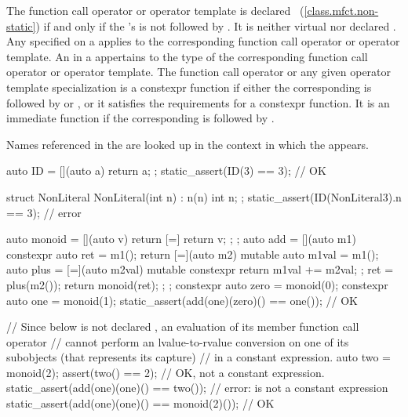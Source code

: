 \pnum
The function call operator or operator template is declared
~(\ref{class.mfct.non-static}) if and only if the
's  is not
followed by . It is neither virtual nor declared . Any
 specified on a 
applies to the corresponding function call operator or operator template.
An  in a  appertains
to the type of the corresponding function call operator or operator template.
The function call operator or any given operator template specialization
is a constexpr function if either
the corresponding 
is followed by  or , or
it satisfies the requirements for a constexpr function.
It is an immediate function
if the corresponding 
 is followed by .
\begin{note}
Names referenced in
the  are looked up in the context in which the
 appears.
\end{note}
\begin{example}
\begin{codeblock}
auto ID = [](auto a) { return a; };
static_assert(ID(3) == 3);                      // OK

struct NonLiteral {
  NonLiteral(int n) : n(n) { }
  int n;
};
static_assert(ID(NonLiteral{3}).n == 3);        // error
\end{codeblock}
\end{example}

\pnum
\begin{example}
\begin{codeblock}
auto monoid = [](auto v) { return [=] { return v; }; };
auto add = [](auto m1) constexpr {
  auto ret = m1();
  return [=](auto m2) mutable {
    auto m1val = m1();
    auto plus = [=](auto m2val) mutable constexpr
                   { return m1val += m2val; };
    ret = plus(m2());
    return monoid(ret);
  };
};
constexpr auto zero = monoid(0);
constexpr auto one = monoid(1);
static_assert(add(one)(zero)() == one());       // OK

// Since  below is not declared , an evaluation of its  member function call operator
// cannot perform an lvalue-to-rvalue conversion on one of its subobjects (that represents its capture)
// in a constant expression.
auto two = monoid(2);
assert(two() == 2); // OK, not a constant expression.
static_assert(add(one)(one)() == two());        // error:  is not a constant expression
static_assert(add(one)(one)() == monoid(2)());  // OK
\end{codeblock}
\end{example}

